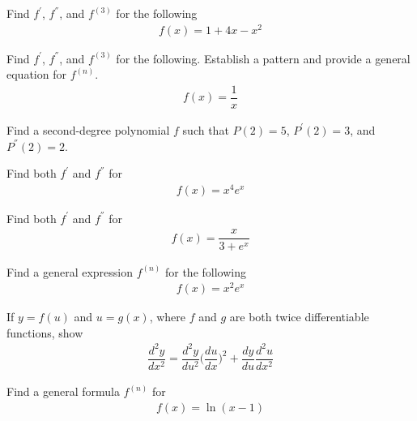 \begin{exercise}
Find $f^{'}$, $f^{''}$, and $f^{(3)}$ for the following
\begin{align*}
    f(x) = 1 + 4x - x^{2}
\end{align*}
\end{exercise}

\begin{exercise}
Find $f^{'}$, $f^{''}$, and $f^{(3)}$ for the following. Establish a pattern and provide a general equation for $f^{(n)}$.
\begin{align*}
    f(x) = \dfrac{1}{x}
\end{align*}
\end{exercise}

\begin{exercise}
Find a second-degree polynomial $f$ such that $P(2) = 5$, $P^{'}(2) = 3$, and $P^{''}(2) = 2$.
\end{exercise}

\begin{exercise}
Find both $f^{'}$ and $f^{''}$ for
\begin{align*}
    f(x) = x^{4}e^{x}
\end{align*}
\end{exercise}

\begin{exercise}
Find both $f^{'}$ and $f^{''}$ for
\begin{align*}
    f(x) = \dfrac{x}{3+e^{x}} 
\end{align*}
\end{exercise}

\begin{exercise}
Find a general expression $f^{(n)}$ for the following
\begin{align*}
    f(x) = x^{2}e^{x}
\end{align*}
\end{exercise}

\begin{exercise}
If $y = f(u)$ and $u = g(x)$, where $f$ and $g$ are both twice differentiable functions, show
\begin{align*}
    \dfrac{d^{2}y}{dx^{2}} = \dfrac{d^{2}y}{du^{2}}\Big(\dfrac{du}{dx}\Big)^{2} + \dfrac{dy}{du}\dfrac{d^{2}u}{dx^{2}}
\end{align*}
\end{exercise}

\begin{exercise}
Find a general formula $f^{(n)}$ for
\begin{align*}
    f(x) = \ln(x-1)
\end{align*}
\end{exercise}

